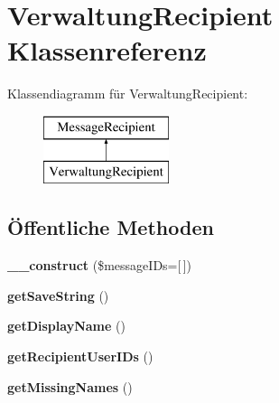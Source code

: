 \hypertarget{class_verwaltung_recipient}{}\section{Verwaltung\+Recipient Klassenreferenz}
\label{class_verwaltung_recipient}
Klassendiagramm für Verwaltung\+Recipient\+:\begin{figure}[H]
\begin{center}
\leavevmode
\includegraphics[height=2.000000cm]{class_verwaltung_recipient}
\end{center}
\end{figure}
\subsection*{Öffentliche Methoden}
\begin{DoxyCompactItemize}
\item 
\mbox{\label{class_verwaltung_recipient_a59a2325c54586c27d10d6d7857a55a05}} 
{\bfseries \+\_\+\+\_\+construct} (\$message\+I\+Ds=\mbox{[}$\,$\mbox{]})
\item 
\mbox{\label{class_verwaltung_recipient_a6e3fdc4972457d839bdc68ea6aec2890}} 
{\bfseries get\+Save\+String} ()
\item 
\mbox{\label{class_verwaltung_recipient_a296f6eb7975a445cc2c4fca11952fefd}} 
{\bfseries get\+Display\+Name} ()
\item 
\mbox{\label{class_verwaltung_recipient_a209d399a6d764583d3ffaa4c81871105}} 
{\bfseries get\+Recipient\+User\+I\+Ds} ()
\item 
\mbox{\label{class_verwaltung_recipient_af2ece8e089b322e73a149cf128e1b042}} 
{\bfseries get\+Missing\+Names} ()
\end{DoxyCompactItemize}
